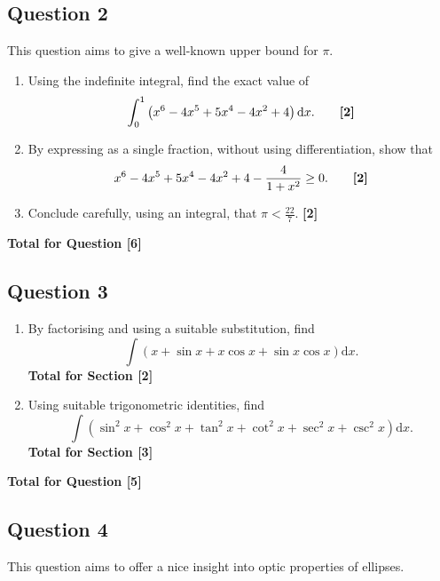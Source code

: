 \documentclass[12pt]{article}
\begin{document}
        \subsection{Question 2}
            This question aims to give a well-known upper bound for $\pi$.
    
            \begin{enumerate}
                \item Using the indefinite integral, find the exact value of
                    \[
                    \int_0^1 \left(x^6 - 4x^5 + 5x^4 - 4x^2 + 4\right) \mathrm{d}x. \tag*{\textbf{[2]}}
                    \]
                    
                \item By expressing as a single fraction, without using differentiation, show that
                    \[
                    x^6 - 4x^5 + 5x^4 - 4x^2 + 4 - \frac{4}{1+x^2} \geq 0. \tag*{\textbf{[2]}}
                    \]
                    
                \item Conclude carefully, using an integral, that \(\pi < \frac{22}{7}\).
                    \hfill\textbf{[2]}
            \end{enumerate}
            
            \hfill\textbf{Total for Question [6]}
    
        \subsection{Question 3}
            \begin{enumerate}
                \item By factorising and using a suitable substitution, find
                \[
                    \int (x + \sin x + x \cos x + \sin x \cos x )\mathrm{d}x.
                \]
                \hfill\textbf{Total for Section [2]}

                \item Using suitable trigonometric identities, find
                \[
                    \int (\sin^2 x + \cos^2 x + \tan^2 x + \cot^2 x + \sec^2 x + \csc^2 x) \mathrm{d}x.
                \]
                \hfill\textbf{Total for Section [3]}
            \end{enumerate}
            
            \hfill\textbf{Total for Question [5]}
            
        \subsection{Question 4}
            This question aims to offer a nice insight into optic properties of ellipses.
\end{document}
